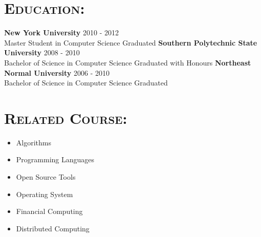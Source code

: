 \begin{resume}




\section{\textsc{Education:}}

\textbf{New York University} \hfill 2010 - 2012 \\
\hspace*{0.2in}Master Student in Computer Science \hfill Graduated
\newline
\textbf{Southern Polytechnic State University} \hfill 2008 - 2010 \\ 
\hspace*{0.2in}Bachelor of Science in Computer Science \hfill Graduated with Honours
\newline
\textbf{Northeast Normal University} \hfill 2006 - 2010 \\
\hspace*{0.2in}Bachelor of Science in Computer Science \hfill Graduated


\section{\textsc{Related Course:}}

\begin{multicols}{2}
\begin{itemize}
    \item Algorithms
    \item Programming Languages
    \item Open Source Tools
    \item Operating System
    \item Financial Computing 
    \item Distributed Computing
\end{itemize}
\end{multicols}



\end{resume}
